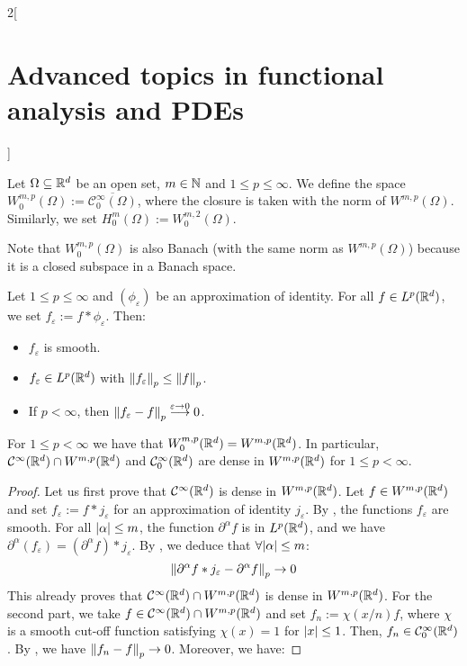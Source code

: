 \documentclass[../../../main_math.tex]{subfiles}
\begin{document}
\begin{multicols}{2}[\section{Advanced topics in functional analysis and PDEs}]
  \begin{definition}
    Let $\Omega\subseteq \mathbb{R}^d$ be an open set, $m\in\mathbb{N}$ and $1\leq p\leq \infty$. We define the space $W_0^{m,p}(\Omega):=\overline{\mathcal{C}_0^\infty(\Omega)}$, where the closure is taken with the norm of $W^{m,p}(\Omega)$. Similarly, we set $H_0^m(\Omega):=W_0^{m,2}(\Omega)$.
  \end{definition}
  \begin{remark}
    Note that $W_0^{m,p}(\Omega)$ is also Banach (with the same norm as $W^{m,p}(\Omega)$) because it is a closed subspace in a Banach space.
  \end{remark}
  \begin{lemma}\label{ATFAPDE:smooth_convolution}
    Let $1\leq p\leq \infty$ and $(\phi_\varepsilon)$ be an approximation of identity. For all $f\in L^p(\mathbb{R}^d)$, we set $f_\varepsilon:= f*\phi_\varepsilon$. Then:
    \begin{itemize}
      \item $f_\varepsilon$ is smooth.
      \item $f_\varepsilon\in L^p(\mathbb{R}^d)$ with $\left\|f_\varepsilon\right\|_p\leq \left\|f\right\|_p$.
      \item If $p<\infty$, then $\left\|f_\varepsilon-f\right\|_p\overset{\varepsilon\to 0}\longrightarrow 0$.
    \end{itemize}
  \end{lemma}
  \begin{theorem}
    For $1\leq p < \infty$ we have that $W_0^{m,p}(\mathbb{R}^d)=W^{m,p}(\mathbb{R}^d)$. In particular, $\mathcal{C}^\infty(\mathbb{R}^d)\cap W^{m,p}(\mathbb{R}^d)$ and $\mathcal{C}_0^{\infty}(\mathbb{R}^d)$ are dense in $W^{m,p}(\mathbb{R}^d)$ for $1\leq p<\infty$.
  \end{theorem}
  \begin{proof}
    Let us first prove that $\mathcal{C}^\infty(\mathbb{R}^d)$ is dense in $W^{m,p}(\mathbb{R}^d)$. Let $f\in W^{m,p}(\mathbb{R}^d)$ and set $f_\varepsilon:=f*j_\varepsilon$ for an approximation of identity $j_\varepsilon$. By , the functions $f_\varepsilon$ are smooth. For all $\abs{\alpha}\leq m$, the function $\partial^\alpha f$ is in $L^p(\mathbb{R}^d)$, and we have $\partial^\alpha(f_\varepsilon)=(\partial^\alpha f)*j_\varepsilon$. By , we deduce that $\forall\abs{\alpha}\leq m$:
    $$
      \left\|\partial^\alpha f*j_\varepsilon-\partial^\alpha f\right\|_p\to 0
    $$
    This already proves that $\mathcal{C}^\infty(\mathbb{R}^d)\cap W^{m,p}(\mathbb{R}^d)$ is dense in $W^{m,p}(\mathbb{R}^d)$.
    For the second part, we take $f\in \mathcal{C}^\infty(\mathbb{R}^d)\cap W^{m,p}(\mathbb{R}^d)$ and set $f_n:=\chi(x/n)f$, where $\chi$ is a smooth cut-off function satisfying $\chi(x)=1$ for $\abs{x}\leq 1$. Then, $f_n\in \mathcal{C}_0^\infty(\mathbb{R}^d)$. By , we have $\left\|f_n-f\right\|_p\to 0$. Moreover, we have:

\end{proof}
\end{multicols}
\end{document}
